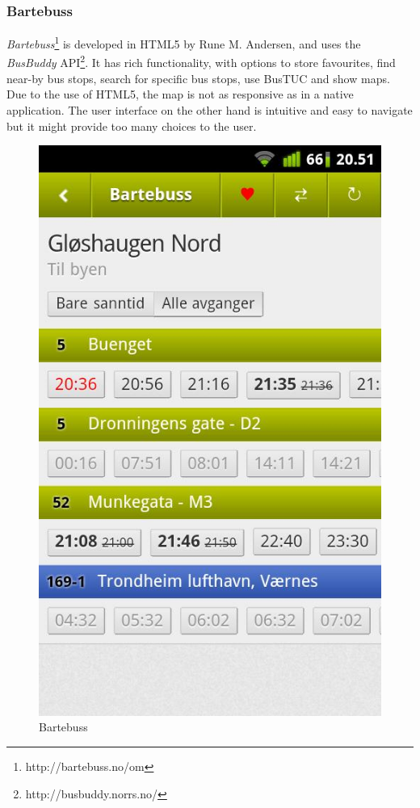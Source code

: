\subsubsection{Bartebuss}
\label{sec:bartebuss}
\emph{Bartebuss}\footnote{http://bartebuss.no/om} is developed in HTML5 by Rune M. Andersen,  and uses the \emph{BusBuddy} API\footnote{http://busbuddy.norrs.no/}. It has rich functionality, with options to store favourites, find near-by bus stops, search for specific bus stops, use BusTUC and show maps. Due to the use of HTML5, the map is not as responsive as in a native application. The user interface on the other hand is intuitive and easy to navigate but it might provide too many choices to the user.
\setlength{\intextsep}{0pt}
\begin{figure}
  \begin{center}
    \includegraphics[scale=0.25]{ExistingSolutions/bartebuss.jpg}
  \end{center}
  \caption{Bartebuss}
\end{figure}
